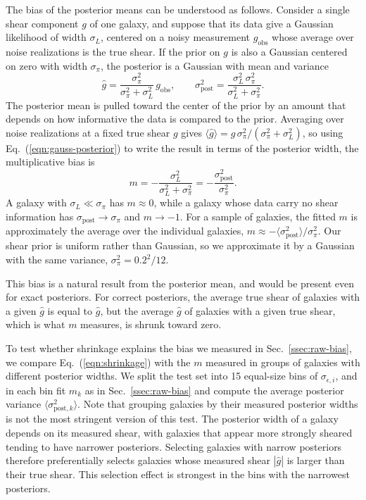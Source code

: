 The bias of the posterior means can be understood as follows. Consider a single shear component $g$ of one galaxy, and suppose that its data give a Gaussian likelihood of width $\sigma_L$, centered on a noisy measurement $g_\mathrm{obs}$ whose average over noise realizations is the true shear. If the prior on $g$ is also a Gaussian centered on zero with width $\sigma_\pi$, the posterior is a Gaussian with mean and variance
\begin{equation}
\label{eqn:gauss-posterior}
    \hat{g} = \frac{\sigma_\pi^2}{\sigma_\pi^2 + \sigma_L^2}\, g_\mathrm{obs}, \qquad
    \sigma_\mathrm{post}^2 = \frac{\sigma_L^2\, \sigma_\pi^2}{\sigma_L^2 + \sigma_\pi^2}.
\end{equation}
The posterior mean is pulled toward the center of the prior by an amount that depends on how informative the data is compared to the prior. Averaging over noise realizations at a fixed true shear $g$ gives $\langle \hat{g} \rangle = g\,\sigma_\pi^2/(\sigma_\pi^2 + \sigma_L^2)$, so using Eq.~(\ref{eqn:gauss-posterior}) to write the result in terms of the posterior width, the multiplicative bias is
\begin{equation}
\label{eqn:shrinkage}
    m = -\frac{\sigma_L^2}{\sigma_L^2 + \sigma_\pi^2} = -\frac{\sigma_\mathrm{post}^2}{\sigma_\pi^2}.
\end{equation}
A galaxy with $\sigma_L \ll \sigma_\pi$ has $m \approx 0$, while a galaxy whose data carry no shear information has $\sigma_\mathrm{post} \to \sigma_\pi$ and $m \to -1$. For a sample of galaxies, the fitted $m$ is approximately the average over the individual galaxies, $m \approx -\langle \sigma_\mathrm{post}^2 \rangle / \sigma_\pi^2$. Our shear prior is uniform rather than Gaussian, so we approximate it by a Gaussian with the same variance, $\sigma_\pi^2 = 0.2^2/12$.

This bias is a natural result from the posterior mean, and would be present even for exact posteriors. For correct posteriors, the average true shear of galaxies with a given $\hat{g}$ is equal to $\hat{g}$, but the average $\hat{g}$ of galaxies with a given true shear, which is what $m$ measures, is shrunk toward zero.

To test whether shrinkage explains the bias we measured in Sec.~\ref{ssec:raw-bias}, we compare Eq.~(\ref{eqn:shrinkage}) with the $m$ measured in groups of galaxies with different posterior widths. We split the test set into 15 equal-size bins of $\sigma_{\epsilon,i}$, and in each bin fit $m_k$ as in Sec.~\ref{ssec:raw-bias} and compute the average posterior variance $\langle \sigma_{\mathrm{post},k}^2 \rangle$. Note that grouping galaxies by their measured posterior widths is not the most stringent version of this test. The posterior width of a galaxy depends on its measured shear, with galaxies that appear more strongly sheared tending to have narrower posteriors. Selecting galaxies with narrow posteriors therefore preferentially selects galaxies whose measured shear $|\hat{g}|$ is larger than their true shear. This selection effect is strongest in the bins with the narrowest posteriors.

